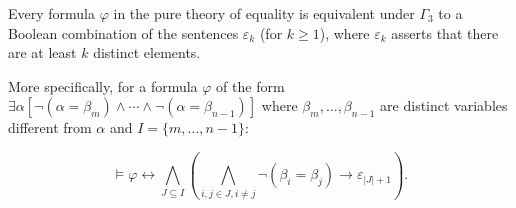 Every formula $\varphi$ in the pure theory of equality is equivalent under $\Gamma_3$ to a Boolean combination of the sentences $\varepsilon_k$ (for $k \geq 1$), where $\varepsilon_k$ asserts that there are at least $k$ distinct elements.

More specifically, for a formula $\varphi$ of the form $\exists\alpha[\neg(\alpha = \beta_m) \land \cdots \land \neg(\alpha = \beta_{n-1})]$ where $\beta_m,\ldots,\beta_{n-1}$ are distinct variables different from $\alpha$ and $I = \{m,\ldots,n-1\}$:

$$\models \varphi \leftrightarrow \bigwedge_{J \subseteq I} \left(\bigwedge_{i,j \in J, i \neq j} \neg(\beta_i = \beta_j) \rightarrow \varepsilon_{|J|+1}\right).$$
